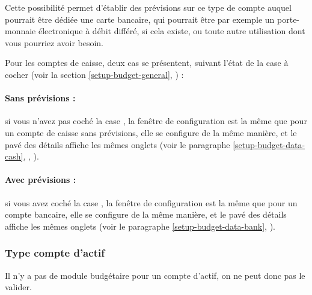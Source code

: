 Cette possibilité permet d'établir des prévisions sur ce type de compte auquel pourrait être dédiée une carte bancaire, qui pourrait être par exemple un porte-monnaie électronique à débit différé, si cela existe, ou toute autre utilisation dont vous pourriez avoir besoin.

Pour les comptes de caisse, deux cas se présentent, suivant l'état de la case à cocher    (voir la section \vref{setup-budget-general}, ) :

\paragraph{Sans prévisions :} si vous n'avez pas coché la case , la fenêtre de configuration est la même que pour un compte de caisse sans prévisions, elle se configure de la même manière, et le pavé des détails affiche les mêmes onglets (voir le paragraphe \vref{setup-budget-data-cash}, , ).

\paragraph{Avec prévisions :} si vous avez coché la case , la fenêtre de configuration est la même que pour un compte bancaire, elle se configure de la même manière, et le pavé des détails affiche les mêmes onglets (voir le paragraphe \vref{setup-budget-data-bank}, ).


\subsubsection{Type compte d'actif\label{setup-budget-data-asset}}

Il n'y a pas de module budgétaire pour un compte d'actif, on ne peut donc pas le valider.



